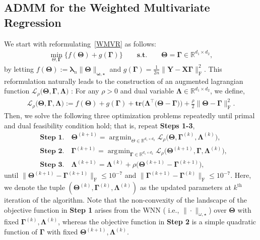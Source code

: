 \documentclass[alpha-refs]{wiley-article}
\DeclareMathOperator*{\argmin}{\arg\!\min}
\begin{document}
\subsection{ADMM for the Weighted Multivariate Regression} \label{WMVR-ADMM}
We start with reformulating~\eqref{WMVR} as follows:
\begin{align} \label{reform}
    \min_{\Theta, \boldsymbol{\Gamma}} \bigg\{ f(\boldsymbol{\Theta}) + g(\boldsymbol{\Gamma}) \bigg\}
    \qquad \textbf{s.t.} \qquad \boldsymbol{\Theta} = \boldsymbol{\Gamma} \in \mathbb{R}^{d_{1}\times d_{2}},
\end{align}
by letting $f(\boldsymbol{\Theta}):=\boldsymbol{\lambda}_{n}\|\boldsymbol{\Theta}\|_{\boldsymbol{\omega,\star}}$ and $g(\boldsymbol{\Gamma})=\frac{1}{2n}\|\boldsymbol{Y}-\boldsymbol{X}\boldsymbol{\Gamma}\|_{\text{F}}^{2}$.
This reformulation naturally leads to the construction of an augmented lagrangian function $\mathcal{L}_{\rho}\big(\boldsymbol{\Theta},\boldsymbol{\Gamma},\boldsymbol{\Lambda}\big)$ : For any $\rho>0$ and dual variable $\boldsymbol{\Lambda} \in \mathbb{R}^{d_{1}\times d_{2}}$, we define,
\begin{align} \label{Lagrangian}
    \mathcal{L}_{\rho}\big(\boldsymbol{\Theta},\boldsymbol{\Gamma},\boldsymbol{\Lambda}\big):=
    f(\boldsymbol{\Theta}) + g(\boldsymbol{\Gamma}) + \textbf{tr}\big( \boldsymbol{\Lambda}^{\top}\big( \boldsymbol{\Theta}-\boldsymbol{\Gamma} \big)\big)
    + \frac{\rho}{2} \| \boldsymbol{\Theta}-\boldsymbol{\Gamma} \|_{\text{F}}^{2}.
\end{align}
Then, we solve the following three optimization problems repeatedly until primal and dual feasibility condition hold; that is,
repeat \textbf{Steps 1-3},
\begin{align*}
    &\textbf{Step 1.} \quad \boldsymbol{\Theta}^{(k+1)} = \argmin_{\Theta \in \mathbb{R}^{d_{1} \times d_{2}}} \mathcal{L}_{\rho} \big( \boldsymbol{\Theta},\boldsymbol{\Gamma}^{(k)},\boldsymbol{\Lambda}^{(k)} \big), \\
    &\textbf{Step 2.} \quad \boldsymbol{\Gamma}^{(k+1)} = \argmin_{\boldsymbol{\Gamma} \in \mathbb{R}^{d_{1} \times d_{2}}} \mathcal{L}_{\rho} \big( \boldsymbol{\Theta}^{(k+1)},\boldsymbol{\Gamma},\boldsymbol{\Lambda}^{(k)} \big),  \\
    &\textbf{Step 3.} \quad \boldsymbol{\Lambda}^{(k+1)} = \boldsymbol{\Lambda}^{(k)} + \rho\big( \boldsymbol{\Theta}^{(k+1)}-\boldsymbol{\Gamma}^{(k+1)} \big),
\end{align*}
until $\| \boldsymbol{\Theta}^{(k+1)}-\boldsymbol{\Gamma}^{(k+1)} \|_{\text{F}}\leq 10^{-7}$ and $\| \boldsymbol{\Gamma}^{(k+1)}-\boldsymbol{\Gamma}^{(k)} \|_{\text{F}}\leq 10^{-7}$.
Here, we denote the tuple $(\boldsymbol{\Theta}^{(k)},\boldsymbol{\Gamma}^{(k)},\boldsymbol{\Lambda}^{(k)})$ as the updated parameters at $k^{\text{th}}$ iteration of the algorithm.
Note that the non-convexity of the landscape of the objective function in \textbf{Step 1} arises from the WNN  ( i.e., $\|\cdot\|_{\omega,\star}$) over $\boldsymbol{\Theta}$ with fixed $\boldsymbol{\Gamma}^{(k)},\boldsymbol{\Lambda}^{(k)}$, whereas the objective function in \textbf{Step 2} is a simple quadratic function of $\boldsymbol{\Gamma}$ with fixed $\boldsymbol{\Theta}^{(k+1)},\boldsymbol{\Lambda}^{(k)}$.
\end{document}
